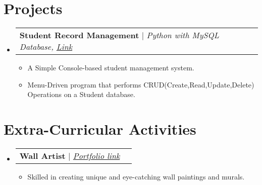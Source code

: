 \documentclass[letterpaper,11pt]{article}
\makeatletter
\newcommand{\resumeItem}[1]{
  \item\small{
    {#1 \vspace{-2pt}}
  }
}
\newcommand{\resumeProjectHeading}[2]{
    \item
    \begin{tabular*}{1.001\textwidth}{l@{\extracolsep{\fill}}r}
      \small#1 & \textbf{\small #2}\\
    \end{tabular*}\vspace{-7pt}
}
\newcommand{\resumeSubHeadingListStart}{\begin{itemize}[leftmargin=0.0in, label={}]}
\newcommand{\resumeSubHeadingListEnd}{\end{itemize}}
\newcommand{\resumeItemListStart}{\begin{itemize}}
\newcommand{\resumeItemListEnd}{\end{itemize}\vspace{-5pt}}
\makeatother
\begin{document}
\section{Projects}
    \vspace{-6pt}
    \resumeSubHeadingListStart
    \resumeProjectHeading
          {\textbf{Student Record Management} $|$ \emph{Python with MySQL Database, \href{https://github.com/izhangit/Student-Record-Management/}{Link}}}{}
          \resumeItemListStart
            \resumeItem{ A Simple Console-based student management system.}
            \resumeItem{Menu-Driven program that performs CRUD(Create,Read,Update,Delete) Operations on a Student database.}
          \resumeItemListEnd
          \vspace{-14pt}
    \resumeSubHeadingListEnd
\vspace{-3pt}


\section{Extra-Curricular Activities}
\vspace{-6pt}
    \resumeSubHeadingListStart
    \resumeProjectHeading
    {\textbf{Wall Artist} $|$ \emph{\href{https://gamma.app/docs/Wall-Artist-Portfolio-khep02ftv69voxh}{Portfolio link}}}{}
    \resumeItemListStart
            \resumeItem{Skilled in creating unique and eye-catching wall paintings and murals.}
          \resumeItemListEnd
    \resumeSubHeadingListEnd
\vspace{-16pt}
\end{document}
